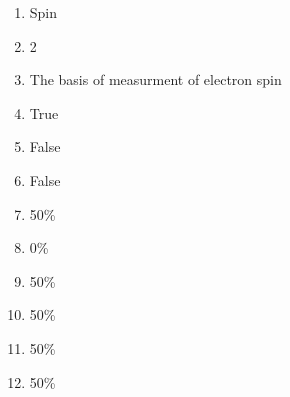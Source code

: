 \documentclass[a4paper]{article}
\begin{document}
    \begin{enumerate}[1.]
        \item Spin
        \item 2
        \item The basis of measurment of electron spin
        \item True
        \item False
        \item False
        \item 50\%
        \item 0\%
        \item 50\%
        \item 50\%
        \item 50\%
        \item 50\%
    \end{enumerate}
\end{document}
